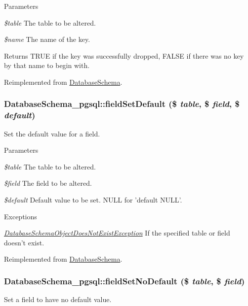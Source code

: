 \begin{DoxyParams}{Parameters}
\item[{\em \$table}]The table to be altered. \item[{\em \$name}]The name of the key.\end{DoxyParams}
\begin{DoxyReturn}{Returns}
TRUE if the key was successfully dropped, FALSE if there was no key by that name to begin with. 
\end{DoxyReturn}


Reimplemented from \hyperlink{classDatabaseSchema_a40519a35f27d1bfe0f2eb0e759df1afd}{DatabaseSchema}.\hypertarget{classDatabaseSchema__pgsql_a2f17e2a4831ccba761ff37080acad92b}{
\subsubsection[{fieldSetDefault}]{\setlength{\rightskip}{0pt plus 5cm}DatabaseSchema\_\-pgsql::fieldSetDefault (\$ {\em table}, \/  \$ {\em field}, \/  \$ {\em default})}}
\label{classDatabaseSchema__pgsql_a2f17e2a4831ccba761ff37080acad92b}
Set the default value for a field.


\begin{DoxyParams}{Parameters}
\item[{\em \$table}]The table to be altered. \item[{\em \$field}]The field to be altered. \item[{\em \$default}]Default value to be set. NULL for 'default NULL'.\end{DoxyParams}

\begin{DoxyExceptions}{Exceptions}
\item[{\em \hyperlink{classDatabaseSchemaObjectDoesNotExistException}{DatabaseSchemaObjectDoesNotExistException}}]If the specified table or field doesn't exist. \end{DoxyExceptions}


Reimplemented from \hyperlink{classDatabaseSchema_a0e7b9c13344b59584bf6e1ddea009592}{DatabaseSchema}.\hypertarget{classDatabaseSchema__pgsql_ab2d9f824a7b01c5b6ed218cd6beae1cb}{
\subsubsection[{fieldSetNoDefault}]{\setlength{\rightskip}{0pt plus 5cm}DatabaseSchema\_\-pgsql::fieldSetNoDefault (\$ {\em table}, \/  \$ {\em field})}}
\label{classDatabaseSchema__pgsql_ab2d9f824a7b01c5b6ed218cd6beae1cb}
Set a field to have no default value.


